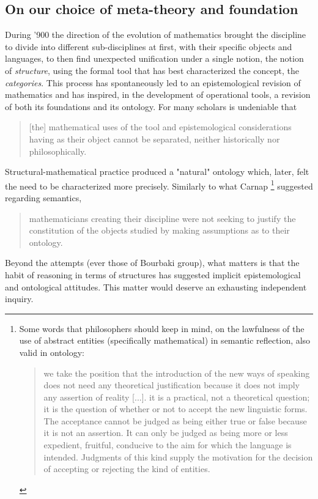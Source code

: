 \subsection{On our choice of meta-theory and foundation}
During '900 the direction of the evolution of mathematics brought the discipline to divide into different sub-disciplines at first, with their specific objects and languages, to then find unexpected unification under a single notion, the notion of \emph{structure}, using the formal tool that has best characterized the concept, the \emph{categories}. This process has spontaneously led to an epistemological revision of mathematics and has inspired, in the development of operational tools, a revision of both its foundations and its ontology. For many scholars is undeniable that
\begin{quote}
    [the] mathematical uses of the tool \CT and epistemological considerations having \CT as their object cannot be separated, neither historically nor philosophically. \cite{kromer2007tool}
\end{quote}
Structural-mathematical practice produced a "natural" ontology which, later, felt the need to be characterized more precisely. Similarly to what Carnap \footnote{Some words that philosophers should keep in mind, on the lawfulness of the use of abstract entities (specifically mathematical) in semantic reflection, also valid in ontology:
    \begin{quote}
        we take the position that the introduction of the new ways of speaking does not need any theoretical justification because it does not imply any assertion of reality [...].  it is a practical, not a theoretical question; it is the question of whether or not to accept the new linguistic forms. The acceptance cannot be judged as being either true or false because it is not an assertion. It can only be judged as being more or less expedient, fruitful, conducive to the aim for which the language is intended. Judgments of this kind supply the motivation for the decision of accepting or rejecting the kind of entities. \hfill \cite{carnap1956meaning}
    \end{quote}} suggested regarding semantics,
\begin{quote}
    mathematicians creating their discipline were not seeking to justify the constitution of the objects studied by making assumptions as to their ontology.\hfill  \cite{kromer2007tool}
\end{quote}
Beyond the attempts (ever those of Bourbaki group), what matters is that the habit of reasoning in terms of structures has suggested implicit epistemological and ontological attitudes. This matter would deserve an exhausting independent inquiry.

